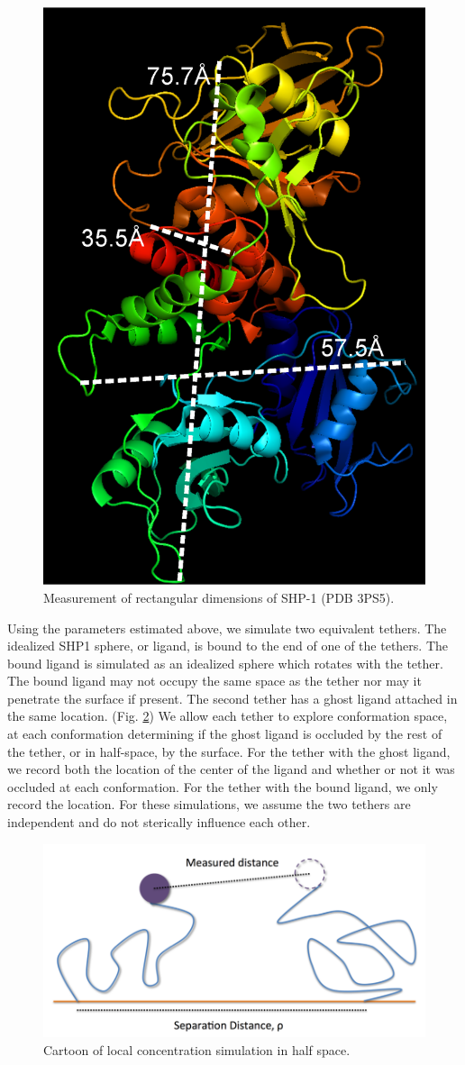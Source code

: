 \documentclass[../../AdvancementSummary.tex]{subfiles}
\begin{document}
\begin{figure}[H]
\begin{center}
\includegraphics[width=0.4\linewidth]{ResultsFigures/SHP1PyMol/LengthWidthDepth.eps}
\end{center}
\caption{Measurement of rectangular dimensions of SHP-1 (PDB 3PS5).  \label{fig: SHP1Rectangle} }
\end{figure}

Using the parameters estimated above, we simulate two equivalent tethers.  The idealized SHP1 sphere, or ligand, is bound to the end of one of the tethers. The bound ligand is simulated as an idealized sphere which rotates with the tether.  The bound ligand may not occupy the same space as the tether nor may it penetrate the surface if present. The second tether has a ghost ligand attached in the same location.  (Fig. \ref{fig: LocalConcCartoon}) We allow each tether to explore conformation space, at each conformation determining if the ghost ligand is occluded by the rest of the tether, or in half-space, by the surface. For the tether with the ghost ligand, we record both the location of the center of the ligand and whether or not it was occluded at each conformation.  For the tether with the bound ligand, we only record the location. For these simulations, we assume the two tethers are independent and do not sterically influence each other.

\begin{figure}
\includegraphics[width=\linewidth]{Diagram.png}
\caption{Cartoon of local concentration simulation in half space. \label{fig: LocalConcCartoon}}
\end{figure}
\end{document}
